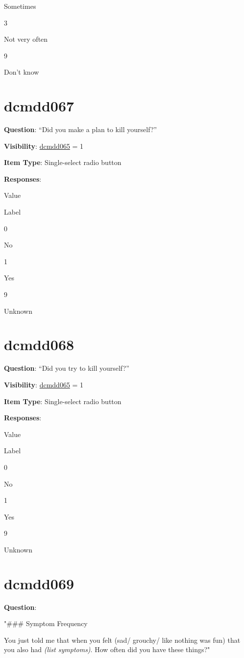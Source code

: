 \documentclass[
]{book}
\begin{document}
Sometimes

3

Not very often

9

Don't know

\hypertarget{dcmdd067}{%
\section{dcmdd067}\label{dcmdd067}}

\textbf{Question}: ``Did you make a plan to kill yourself?''

\textbf{Visibility}: \protect\hyperlink{dcmdd065}{dcmdd065} = 1

\textbf{Item Type}: Single-select radio button

\textbf{Responses}:

Value

Label

0

No

1

Yes

9

Unknown

\hypertarget{dcmdd068}{%
\section{dcmdd068}\label{dcmdd068}}

\textbf{Question}: ``Did you try to kill yourself?''

\textbf{Visibility}: \protect\hyperlink{dcmdd065}{dcmdd065} = 1

\textbf{Item Type}: Single-select radio button

\textbf{Responses}:

Value

Label

0

No

1

Yes

9

Unknown

\hypertarget{dcmdd069}{%
\section{dcmdd069}\label{dcmdd069}}

\textbf{Question}:

"\#\#\# Symptom Frequency

You just told me that when you felt (sad/ grouchy/ like nothing was fun) that you also had \emph{(list symptoms)}. How often did you have these things?"
\end{document}
